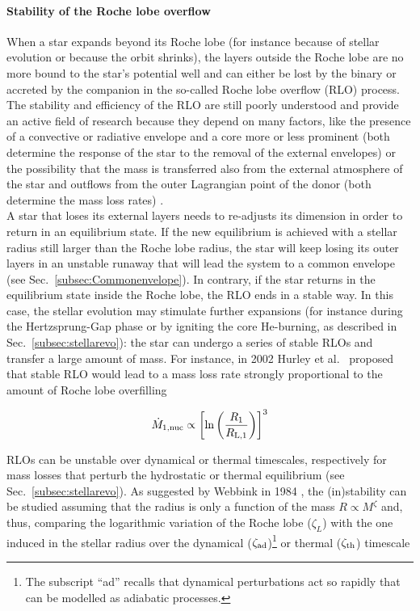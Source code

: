 \documentclass[a4paper,titlepage]{book}     	%
\newcommand{\mdot}{\ensuremath{\dot{M}}}
\newcommand{\rlone}{\ensuremath{R_\textup{L,1}}}
\begin{document}
\paragraph{Stability of the Roche lobe overflow} When a star expands beyond its Roche lobe (for instance because of stellar evolution or because the orbit shrinks), the layers outside the Roche lobe are no more bound to the star's potential well and can either be lost by the binary or accreted by the companion in the so-called Roche lobe overflow (RLO) process. The stability and efficiency of the RLO are still poorly understood and provide an active field of research because they depend on many factors, like the presence of a convective or radiative envelope and a core more or less prominent (both determine the response of the star to the removal of the external envelopes) or the possibility that the mass is transferred also from the external atmosphere of the star and outflows from the outer Lagrangian point of the donor (both determine the mass loss rates) \cite{marchant2021_masstransferMESA}.\\

A star that loses its external layers needs to re-adjusts its dimension in order to return in an equilibrium state. If the new equilibrium is achieved with a stellar radius still larger than the Roche lobe radius, the star will keep losing its outer layers in an unstable runaway that will lead the system to a common envelope (see Sec.\ \ref{subsec:Commonenvelope}). In contrary, if the star returns in the equilibrium state inside the Roche lobe, the RLO ends in a stable way. In this case, the stellar evolution may stimulate further expansions (for instance during the Hertzsprung-Gap phase or by igniting the core He-burning, as described in Sec.\ \ref{subsec:stellarevo}): the star can undergo a series of stable RLOs and transfer a large amount of mass. For instance, in 2002 Hurley et al.\ \cite{Hurley2002} proposed that stable RLO would lead to a mass loss rate strongly proportional to the amount of Roche lobe overfilling 

\begin{equation}\label{eq:masslostRoche}
    \mdot_{1,\rm nuc} \propto \left[ \ln \left(\frac{R_1}{\rlone} \right)\right]^3
\end{equation}

RLOs can be unstable over dynamical or thermal timescales, respectively for mass losses that perturb the hydrostatic or thermal equilibrium (see Sec.\ \ref{subsec:stellarevo}). As suggested by Webbink in 1984 \cite{Webbink1984_CE}, the (in)stability can be studied assuming that the radius is only a function of the mass $R\propto M^{\zeta}$ and, thus, comparing the logarithmic variation of the Roche lobe ($\zeta_L$) with the one induced in the stellar radius over the dynamical ($\zeta_\textup{ad}$)\footnote{The subscript ``ad'' recalls that dynamical perturbations act so rapidly that can be modelled as adiabatic processes.} or thermal ($\zeta_\textup{th}$) timescale
\end{document}
